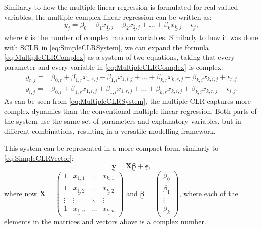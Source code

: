 \documentclass[
]{book}
\begin{document}
Similarly to how the multiple linear regression is formulated for real valued variables, the multiple complex linear regression can be written as:
\begin{equation}
    \underline{y_j} = \underline{\beta_0} + \underline{\beta_1} \underline{x_{1,j}} + \underline{\beta_2} \underline{x_{2,j}} + \dots + \underline{\beta_k} \underline{x_{k,j}} + \underline{\epsilon_j},
    \label{eq:MultipleCLRComplex}
\end{equation}
where \(k\) is the number of complex random variables. Similarly to how it was done with SCLR in \eqref{eq:SimpleCLRSystem}, we can expand the formula \eqref{eq:MultipleCLRComplex} as a system of two equations, taking that every parameter and every variable in \eqref{eq:MultipleCLRComplex} is complex:
\begin{equation}
    \begin{aligned}
        y_{r,j} = & \beta_{0,r} + \beta_{1,r} x_{1,r,j} - \beta_{1,i} x_{1,i,j} + \dots + \beta_{k,r} x_{k,r,j} - \beta_{k,i} x_{k,i,j} + \epsilon_{r,j} \\
        y_{i,j} = & \beta_{0,i} + \beta_{1,r} x_{1,i,j} + \beta_{1,i} x_{1,r,j} + \dots + \beta_{k,r} x_{k,i,j} + \beta_{k,i} x_{k,r,j} + \epsilon_{i,j} .
    \end{aligned}
    \label{eq:MultipleCLRSystem}
\end{equation}
As can be seen from \eqref{eq:MultipleCLRSystem}, the multiple CLR captures more complex dynamics than the conventional multiple linear regression. Both parts of the system use the same set of parameters and explanatory variables, but in different combinations, resulting in a versatile modelling framework.

This system can be represented in a more compact form, similarly to \eqref{eq:SimpleCLRVector}:
\begin{equation}
    \underline{\mathbf{y}} = \underline{\mathbf{X}} \underline{\boldsymbol{\beta}} + \underline{\boldsymbol{\epsilon}} ,
    \label{eq:CLRVector}
\end{equation}
where now \(\underline{\mathbf{X}} = \begin{pmatrix} 1 & \underline{{x}_{1,1}} & \dots & \underline{{x}_{k,1}} \\ 1 & \underline{{x}_{1,2}} & \dots & \underline{{x}_{k,2}} \\ \vdots & \vdots & \ddots & \vdots \\ 1 & \underline{{x}_{1,n}} & \dots & \underline{{x}_{k,n}} \end{pmatrix}\) and \(\underline{\boldsymbol{\beta}} = \begin{pmatrix} \underline{{\beta}_0} \\ \underline{{\beta}_1} \\ \vdots \\ \underline{{\beta}_k} \end{pmatrix}\), where each of the elements in the matrices and vectors above is a complex number.
\end{document}

